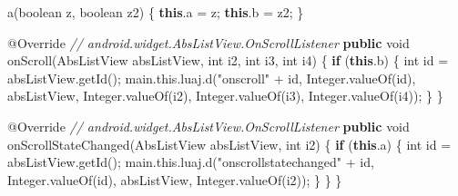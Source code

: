 \documentclass[
]{article}
\newenvironment{Shaded}{}{}
\newcommand{\AttributeTok}[1]{\textcolor[rgb]{0.49,0.56,0.16}{#1}}
\newcommand{\BuiltInTok}[1]{\textcolor[rgb]{0.00,0.50,0.00}{#1}}
\newcommand{\CommentTok}[1]{\textcolor[rgb]{0.38,0.63,0.69}{\textit{#1}}}
\newcommand{\ControlFlowTok}[1]{\textcolor[rgb]{0.00,0.44,0.13}{\textbf{#1}}}
\newcommand{\DataTypeTok}[1]{\textcolor[rgb]{0.56,0.13,0.00}{#1}}
\newcommand{\FunctionTok}[1]{\textcolor[rgb]{0.02,0.16,0.49}{#1}}
\newcommand{\KeywordTok}[1]{\textcolor[rgb]{0.00,0.44,0.13}{\textbf{#1}}}
\newcommand{\NormalTok}[1]{#1}
\newcommand{\OperatorTok}[1]{\textcolor[rgb]{0.40,0.40,0.40}{#1}}
\newcommand{\StringTok}[1]{\textcolor[rgb]{0.25,0.44,0.63}{#1}}
\begin{document}
\begin{Shaded}
\begin{Highlighting}[]
        \FunctionTok{a}\OperatorTok{(}\DataTypeTok{boolean}\NormalTok{ z}\OperatorTok{,} \DataTypeTok{boolean}\NormalTok{ z2}\OperatorTok{)} \OperatorTok{\{}
            \KeywordTok{this}\OperatorTok{.}\FunctionTok{a} \OperatorTok{=}\NormalTok{ z}\OperatorTok{;}
            \KeywordTok{this}\OperatorTok{.}\FunctionTok{b} \OperatorTok{=}\NormalTok{ z2}\OperatorTok{;}
        \OperatorTok{\}}

        \AttributeTok{@Override} \CommentTok{// android.widget.AbsListView.OnScrollListener}
        \KeywordTok{public} \DataTypeTok{void} \FunctionTok{onScroll}\OperatorTok{(}\NormalTok{AbsListView absListView}\OperatorTok{,} \DataTypeTok{int}\NormalTok{ i2}\OperatorTok{,} \DataTypeTok{int}\NormalTok{ i3}\OperatorTok{,} \DataTypeTok{int}\NormalTok{ i4}\OperatorTok{)} \OperatorTok{\{}
            \ControlFlowTok{if} \OperatorTok{(}\KeywordTok{this}\OperatorTok{.}\FunctionTok{b}\OperatorTok{)} \OperatorTok{\{}
                \DataTypeTok{int}\NormalTok{ id }\OperatorTok{=}\NormalTok{ absListView}\OperatorTok{.}\FunctionTok{getId}\OperatorTok{();}
\NormalTok{                main}\OperatorTok{.}\FunctionTok{this}\OperatorTok{.}\FunctionTok{luaj}\OperatorTok{.}\FunctionTok{d}\OperatorTok{(}\StringTok{"onscroll"} \OperatorTok{+}\NormalTok{ id}\OperatorTok{,} \BuiltInTok{Integer}\OperatorTok{.}\FunctionTok{valueOf}\OperatorTok{(}\NormalTok{id}\OperatorTok{),}\NormalTok{ absListView}\OperatorTok{,} \BuiltInTok{Integer}\OperatorTok{.}\FunctionTok{valueOf}\OperatorTok{(}\NormalTok{i2}\OperatorTok{),} \BuiltInTok{Integer}\OperatorTok{.}\FunctionTok{valueOf}\OperatorTok{(}\NormalTok{i3}\OperatorTok{),} \BuiltInTok{Integer}\OperatorTok{.}\FunctionTok{valueOf}\OperatorTok{(}\NormalTok{i4}\OperatorTok{));}
            \OperatorTok{\}}
        \OperatorTok{\}}

        \AttributeTok{@Override} \CommentTok{// android.widget.AbsListView.OnScrollListener}
        \KeywordTok{public} \DataTypeTok{void} \FunctionTok{onScrollStateChanged}\OperatorTok{(}\NormalTok{AbsListView absListView}\OperatorTok{,} \DataTypeTok{int}\NormalTok{ i2}\OperatorTok{)} \OperatorTok{\{}
            \ControlFlowTok{if} \OperatorTok{(}\KeywordTok{this}\OperatorTok{.}\FunctionTok{a}\OperatorTok{)} \OperatorTok{\{}
                \DataTypeTok{int}\NormalTok{ id }\OperatorTok{=}\NormalTok{ absListView}\OperatorTok{.}\FunctionTok{getId}\OperatorTok{();}
\NormalTok{                main}\OperatorTok{.}\FunctionTok{this}\OperatorTok{.}\FunctionTok{luaj}\OperatorTok{.}\FunctionTok{d}\OperatorTok{(}\StringTok{"onscrollstatechanged"} \OperatorTok{+}\NormalTok{ id}\OperatorTok{,} \BuiltInTok{Integer}\OperatorTok{.}\FunctionTok{valueOf}\OperatorTok{(}\NormalTok{id}\OperatorTok{),}\NormalTok{ absListView}\OperatorTok{,} \BuiltInTok{Integer}\OperatorTok{.}\FunctionTok{valueOf}\OperatorTok{(}\NormalTok{i2}\OperatorTok{));}
            \OperatorTok{\}}
        \OperatorTok{\}}
    \OperatorTok{\}}


\end{Highlighting}
\end{Shaded}
\end{document}
